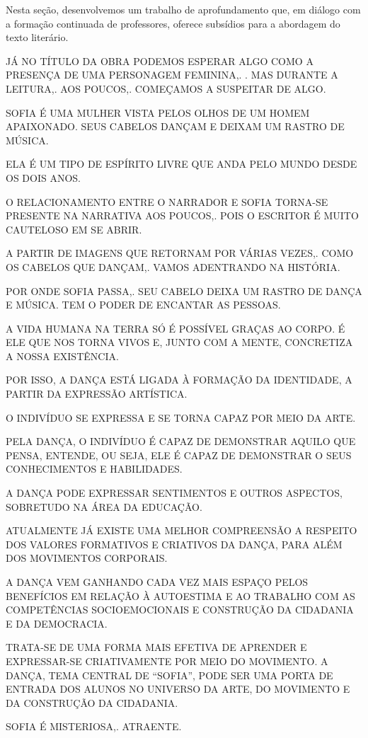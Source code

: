 \documentclass{extarticle}
\begin{document}
Nesta seção, desenvolvemos um trabalho de aprofundamento que, em diálogo
com a formação continuada de professores, oferece subsídios para a
abordagem do texto literário.

JÁ NO TÍTULO DA OBRA PODEMOS ESPERAR ALGO COMO A PRESENÇA DE UMA
PERSONAGEM FEMININA,. . MAS DURANTE A LEITURA,. AOS POUCOS,. COMEÇAMOS A
SUSPEITAR DE ALGO.


SOFIA É UMA MULHER VISTA PELOS OLHOS DE UM HOMEM APAIXONADO. SEUS
CABELOS DANÇAM E DEIXAM UM RASTRO DE MÚSICA.
 
ELA É UM TIPO DE ESPÍRITO LIVRE QUE ANDA PELO MUNDO DESDE OS DOIS ANOS.
 
O RELACIONAMENTO ENTRE O NARRADOR E SOFIA TORNA-SE PRESENTE NA NARRATIVA
AOS POUCOS,. POIS O ESCRITOR É MUITO CAUTELOSO EM SE ABRIR.
 
A PARTIR DE IMAGENS QUE RETORNAM POR VÁRIAS VEZES,. COMO OS CABELOS QUE
DANÇAM,. VAMOS ADENTRANDO NA HISTÓRIA.
 
POR ONDE SOFIA PASSA,. SEU CABELO DEIXA UM RASTRO DE DANÇA E MÚSICA. TEM
O PODER DE ENCANTAR AS PESSOAS.

A VIDA HUMANA NA TERRA SÓ É POSSÍVEL GRAÇAS AO CORPO. É ELE QUE NOS
TORNA VIVOS E, JUNTO COM A MENTE, CONCRETIZA A NOSSA EXISTÊNCIA.~
 
POR ISSO, A DANÇA ESTÁ LIGADA À FORMAÇÃO DA IDENTIDADE, A PARTIR DA
EXPRESSÃO ARTÍSTICA.
 
O INDIVÍDUO SE EXPRESSA E SE TORNA CAPAZ POR MEIO DA ARTE.
 
PELA DANÇA, O INDIVÍDUO É CAPAZ DE DEMONSTRAR AQUILO QUE PENSA, ENTENDE,
OU SEJA, ELE É CAPAZ DE DEMONSTRAR O SEUS CONHECIMENTOS E HABILIDADES.
 
A DANÇA PODE EXPRESSAR SENTIMENTOS E OUTROS ASPECTOS, SOBRETUDO NA ÁREA
DA EDUCAÇÃO.
 
ATUALMENTE JÁ EXISTE UMA MELHOR COMPREENSÃO A RESPEITO DOS VALORES
FORMATIVOS E CRIATIVOS DA DANÇA, PARA ALÉM DOS MOVIMENTOS CORPORAIS.
 
A DANÇA VEM GANHANDO CADA VEZ MAIS ESPAÇO PELOS BENEFÍCIOS EM RELAÇÃO À
AUTOESTIMA E AO TRABALHO COM AS COMPETÊNCIAS SOCIOEMOCIONAIS E
CONSTRUÇÃO DA CIDADANIA E DA DEMOCRACIA.
 
TRATA-SE DE UMA FORMA MAIS EFETIVA DE APRENDER E EXPRESSAR-SE
CRIATIVAMENTE POR MEIO DO MOVIMENTO. A DANÇA, TEMA CENTRAL DE ``SOFIA'',
PODE SER UMA PORTA DE ENTRADA DOS ALUNOS NO UNIVERSO DA ARTE, DO
MOVIMENTO E DA CONSTRUÇÃO DA CIDADANIA.

SOFIA É MISTERIOSA,. ATRAENTE.
 
\end{document}
